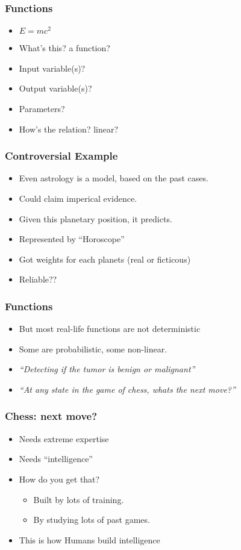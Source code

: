 \begin{frame}[fragile]\frametitle{Functions}
\begin{itemize}
\item $E = mc^2$
\item What's this? a function?
\item Input variable(s)?
\item Output variable(s)?
\item Parameters?
\item How's the relation? linear?
\end{itemize}
\end{frame}

\begin{frame}[fragile]\frametitle{Controversial Example}
\begin{itemize}
\item Even astrology is a model, based on the past cases.
\item Could claim imperical evidence. 
\item Given this planetary position, it predicts.
\item Represented by ``Horoscope''
\item Got weights for each planets (real or ficticous)
\item Reliable??
\end{itemize}
\end{frame}


\begin{frame}[fragile]\frametitle{Functions}
\begin{itemize}
\item But most real-life functions are not deterministic
\item Some are probabilistic, some non-linear.
\item {\em ``Detecting if the tumor is benign or malignant''}
\item {\em ``At any state in the game of chess, whats the next move?''}
\end{itemize}
\end{frame}

\begin{frame}[fragile]\frametitle{Chess: next move?}
\begin{itemize}
\item Needs extreme expertise
\item Needs ``intelligence''
\item How do you get that?
\begin{itemize}
\item Built by lots of training.
\item By studying lots of past games.
\end{itemize}
\item This is how Humans build intelligence
\end{itemize}
\end{frame}

